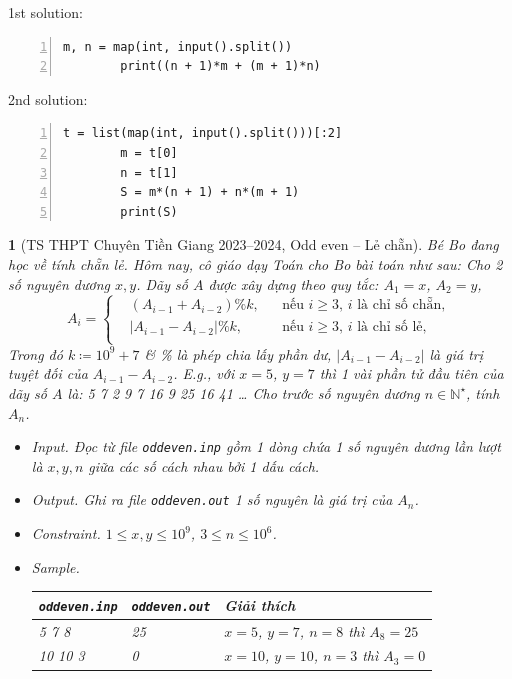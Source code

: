 \documentclass{article}
\newtheorem{baitoan}{}
\begin{document}
\begin{multicols}{2}
	1st solution:
	\begin{Verbatim}[numbers=left,xleftmargin=5mm]
		m, n = map(int, input().split())
		print((n + 1)*m + (m + 1)*n)
	\end{Verbatim}
	\columnbreak
	2nd solution:
	\begin{Verbatim}[numbers=left,xleftmargin=5mm]
		t = list(map(int, input().split()))[:2]
		m = t[0]
		n = t[1]
		S = m*(n + 1) + n*(m + 1)
		print(S)
	\end{Verbatim}
\end{multicols}

\begin{baitoan}[TS THPT Chuyên Tiền Giang 2023--2024, Odd even -- Lẻ chẵn]
	Bé Bo đang học về tính chẵn lẻ. Hôm nay, cô giáo dạy Toán cho Bo bài toán như sau: Cho 2 số nguyên dương $x,y$. Dãy số $A$ được xây dựng theo quy tắc: $A_1 = x$, $A_2 = y$,
	\begin{equation*}
		A_i = \left\{\begin{split}
			&(A_{i-1} + A_{i-2})\%k,&&\mbox{nếu } i\ge3,\,i\mbox{ là chỉ số chẵn},\\
			&|A_{i-1} - A_{i-2}|\%k,&&\mbox{nếu } i\ge3,\,i\mbox{ là chỉ số lẻ},\\
		\end{split}\right.
	\end{equation*}
	Trong đó $k\coloneqq10^9 + 7$ \& \% là phép chia lấy phần dư, $|A_{i-1} - A_{i-2}|$ là giá trị tuyệt đối của $A_{i-1} - A_{i-2}$. E.g., với $x = 5$, $y = 7$ thì 1 vài phần tử đầu tiên của dãy số $A$ là: \emph{5 7 2 9 7 16 9 25 16 41 \ldots} Cho trước số nguyên dương $n\in\mathbb{N}^\star$, tính $A_n$.
	\begin{itemize}
		\item {\sf Input.} Đọc từ file \verb|oddeven.inp| gồm 1 dòng chứa 1 số nguyên dương lần lượt là $x,y,n$ giữa các số cách nhau bởi 1 dấu cách.
		\item {\sf Output.} Ghi ra file \verb|oddeven.out| 1 số nguyên là giá trị của $A_n$.
		\item {\sf Constraint.} $1\le x,y\le10^9$, $3\le n\le10^6$.
		\item {\sf Sample.}
		\begin{table}[H]
			\centering
			\begin{tabular}{|l|l|l|}
				\hline
				{\tt oddeven.inp} & {\tt oddeven.out} & Giải thích \\
				\hline
				5 7 8 & 25 & $x = 5$, $y = 7$, $n = 8$ thì $A_8 = 25$ \\
				\hline
				10 10 3 & 0 & $x = 10$, $y = 10$, $n = 3$ thì $A_3 = 0$ \\
				\hline
			\end{tabular}
		\end{table}
	\end{itemize}
\end{baitoan}
\end{document}

